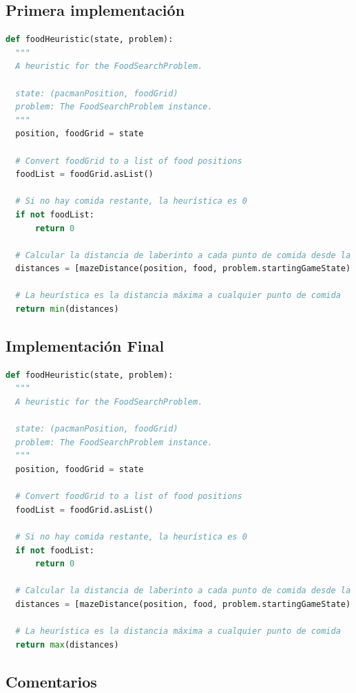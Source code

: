 \documentclass{report}
\begin{document}
        \subsection*{Primera implementación}
          \begin{lstlisting}[language=Python, caption=Implementación inicial de la heurística del problema de las esquinas]
def foodHeuristic(state, problem):
  """
  A heuristic for the FoodSearchProblem.
  
  state: (pacmanPosition, foodGrid)
  problem: The FoodSearchProblem instance.
  """
  position, foodGrid = state

  # Convert foodGrid to a list of food positions
  foodList = foodGrid.asList()

  # Si no hay comida restante, la heurística es 0
  if not foodList:
      return 0

  # Calcular la distancia de laberinto a cada punto de comida desde la posición actual de Pacman
  distances = [mazeDistance(position, food, problem.startingGameState) for food in foodList]

  # La heurística es la distancia máxima a cualquier punto de comida
  return min(distances)
          \end{lstlisting}
        \subsection*{Implementación Final}
          \begin{lstlisting}[language=Python, caption=Implementación final de la heurística del problema de las esquinas]
def foodHeuristic(state, problem):
  """
  A heuristic for the FoodSearchProblem.
  
  state: (pacmanPosition, foodGrid)
  problem: The FoodSearchProblem instance.
  """
  position, foodGrid = state

  # Convert foodGrid to a list of food positions
  foodList = foodGrid.asList()

  # Si no hay comida restante, la heurística es 0
  if not foodList:
      return 0

  # Calcular la distancia de laberinto a cada punto de comida desde la posición actual de Pacman
  distances = [mazeDistance(position, food, problem.startingGameState) for food in foodList]

  # La heurística es la distancia máxima a cualquier punto de comida
  return max(distances)
          \end{lstlisting}
        \subsection*{Comentarios}
\end{document}
